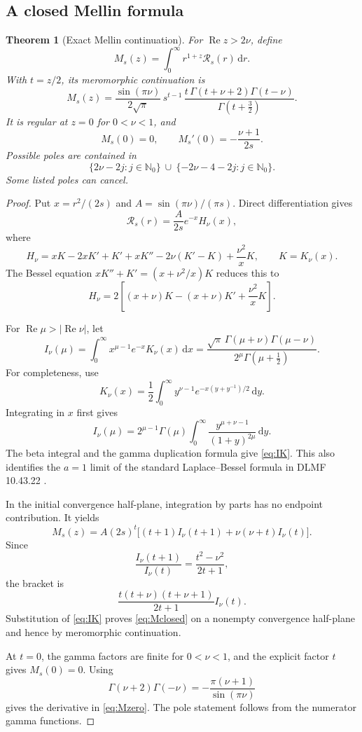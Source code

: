 \documentclass[11pt,a4paper]{article}
\newcommand{\NN}{\mathbb N}
\newcommand{\dd}{\mathrm d}
\newcommand{\abs}[1]{\lvert#1\rvert}
\theoremstyle{plain}
\newtheorem{theorem}{Theorem}[section]
\theoremstyle{definition}
\theoremstyle{remark}
\numberwithin{equation}{section}
\begin{document}
\subsection{A closed Mellin formula}

\begin{theorem}[Exact Mellin continuation]
\label{thm:Mellin}
For \(\operatorname{Re}z>2\nu\), define
\[
 M_s(z)=\int_0^\infty r^{1+z}\mathcal R_s(r)\,\dd r.
\]
With \(t=z/2\), its meromorphic continuation is
\begin{equation}
 \boxed{
 M_s(z)=
 \frac{\sin(\pi\nu)}{2\sqrt\pi}\,
 s^{t-1}\,
 \frac{t\,\Gamma(t+\nu+2)\Gamma(t-\nu)}
      {\Gamma(t+\tfrac32)}.
 }
 \label{eq:Mclosed}
\end{equation}
It is regular at \(z=0\) for \(0<\nu<1\), and
\begin{equation}
 M_s(0)=0,\qquad
 M_s'(0)=-\frac{\nu+1}{2s}.
 \label{eq:Mzero}
\end{equation}
Possible poles are contained in
\[
 \{2\nu-2j:j\in\NN_0\}
 \ \cup\
 \{-2\nu-4-2j:j\in\NN_0\}.
\]
Some listed poles can cancel.
\end{theorem}

\begin{proof}
Put \(x=r^2/(2s)\) and
\(A=\sin(\pi\nu)/(\pi s)\).
Direct differentiation gives
\[
 \mathcal R_s(r)=\frac{A}{2s}e^{-x}H_\nu(x),
\]
where
\[
 H_\nu=
 xK-2xK'+K'+xK''
       -2\nu(K'-K)+\frac{\nu^2}{x}K,
 \qquad K=K_\nu(x).
\]
The Bessel equation
\(xK''+K'=(x+\nu^2/x)K\) reduces this to
\[
 H_\nu=2\left[(x+\nu)K-(x+\nu)K'
                         +\frac{\nu^2}{x}K\right].
\]

For \(\operatorname{Re}\mu>\abs{\operatorname{Re}\nu}\), let
\begin{equation}
 I_\nu(\mu)
 =\int_0^\infty x^{\mu-1}e^{-x}K_\nu(x)\,\dd x
 =\frac{\sqrt\pi\,\Gamma(\mu+\nu)\Gamma(\mu-\nu)}
        {2^\mu\Gamma(\mu+\tfrac12)}.
 \label{eq:IK}
\end{equation}
For completeness, use
\[
 K_\nu(x)=\frac12\int_0^\infty
 y^{\nu-1}e^{-x(y+y^{-1})/2}\,\dd y.
\]
Integrating in \(x\) first gives
\[
 I_\nu(\mu)
 =2^{\mu-1}\Gamma(\mu)
   \int_0^\infty
      \frac{y^{\mu+\nu-1}}{(1+y)^{2\mu}}\,\dd y.
\]
The beta integral and the gamma duplication formula give
\eqref{eq:IK}. This also identifies the \(a=1\) limit of the
standard Laplace--Bessel formula in DLMF 10.43.22
\cite{DLMF}.

In the initial convergence half-plane, integration by parts
has no endpoint contribution. It yields
\[
 M_s(z)=A(2s)^t
 \bigl[(t+1)I_\nu(t+1)+\nu(\nu+t)I_\nu(t)\bigr].
\]
Since
\[
 \frac{I_\nu(t+1)}{I_\nu(t)}
 =\frac{t^2-\nu^2}{2t+1},
\]
the bracket is
\[
 \frac{t(t+\nu)(t+\nu+1)}{2t+1}I_\nu(t).
\]
Substitution of \eqref{eq:IK} proves \eqref{eq:Mclosed}
on a nonempty convergence half-plane and hence by meromorphic
continuation.

At \(t=0\), the gamma factors are finite for \(0<\nu<1\),
and the explicit factor \(t\) gives \(M_s(0)=0\).
Using
\[
 \Gamma(\nu+2)\Gamma(-\nu)
 =-\frac{\pi(\nu+1)}{\sin(\pi\nu)}
\]
gives the derivative in \eqref{eq:Mzero}.
The pole statement follows from the numerator gamma functions.
\end{proof}
\end{document}
